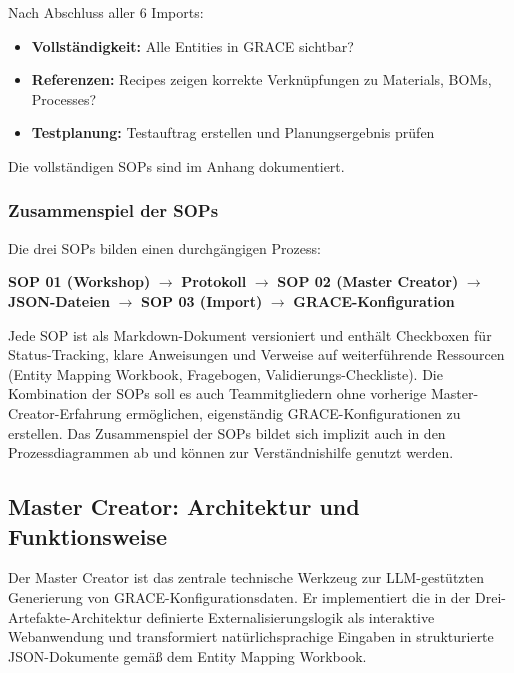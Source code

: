 Nach Abschluss aller 6 Imports:

\begin{itemize}
    \item \textbf{Vollständigkeit:} Alle Entities in GRACE sichtbar?
    \item \textbf{Referenzen:} Recipes zeigen korrekte Verknüpfungen zu Materials, BOMs, Processes?
    \item \textbf{Testplanung:} Testauftrag erstellen und Planungsergebnis prüfen
\end{itemize}

\noindent Die vollständigen SOPs sind im Anhang dokumentiert.

\subsubsection{Zusammenspiel der SOPs}

Die drei SOPs bilden einen durchgängigen Prozess:

\begin{center}
\textbf{SOP 01 (Workshop)} $\rightarrow$ \textbf{Protokoll} $\rightarrow$ \textbf{SOP 02 (Master Creator)} $\rightarrow$ \textbf{JSON-Dateien} $\rightarrow$ \textbf{SOP 03 (Import)} $\rightarrow$ \textbf{GRACE-Konfiguration}
\end{center}

\noindent Jede SOP ist als Markdown-Dokument versioniert und enthält Checkboxen für Status-Tracking, klare Anweisungen und Verweise auf weiterführende Ressourcen (Entity Mapping Workbook, Fragebogen, Validierungs-Checkliste). Die Kombination der SOPs soll es auch Teammitgliedern ohne vorherige Master-Creator-Erfahrung ermöglichen, eigenständig GRACE-Konfigurationen zu erstellen. Das Zusammenspiel der SOPs bildet sich implizit auch in den Prozessdiagrammen ab und können zur Verständnishilfe genutzt werden.


\subsection{Master Creator: Architektur und Funktionsweise}
\label{sec:MasterCreator}

Der Master Creator ist das zentrale technische Werkzeug zur LLM-gestützten Generierung von GRACE-Konfigurationsdaten. Er implementiert die in der Drei-Artefakte-Architektur definierte Externalisierungslogik als interaktive Webanwendung und transformiert natürlichsprachige Eingaben in strukturierte JSON-Dokumente gemäß dem Entity Mapping Workbook.

